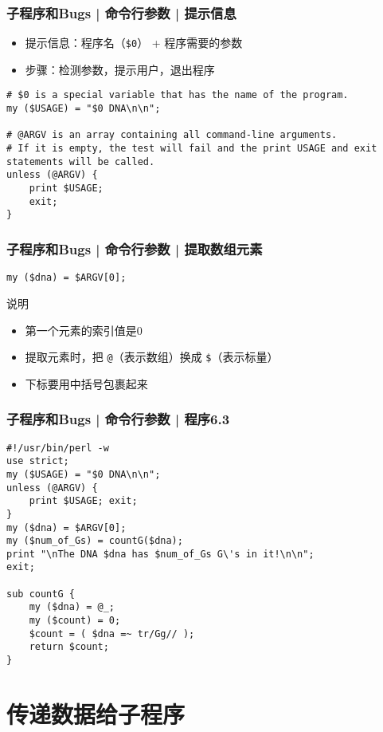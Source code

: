 \begin{frame}[fragile]
  \frametitle{子程序和Bugs | 命令行参数 | \alert{提示信息}}
  \begin{itemize}
    \item 提示信息：程序名（\verb|$0|） + 程序需要的参数
    \item 步骤：检测参数，提示用户，退出程序
  \end{itemize}
\begin{lstlisting}
# $0 is a special variable that has the name of the program.
my ($USAGE) = "$0 DNA\n\n";

# @ARGV is an array containing all command-line arguments.
# If it is empty, the test will fail and the print USAGE and exit statements will be called.
unless (@ARGV) {
    print $USAGE;
    exit;
}
\end{lstlisting}
\end{frame}

\begin{frame}[fragile]
  \frametitle{子程序和Bugs | 命令行参数 | \alert{提取数组元素}}
\begin{lstlisting}
my ($dna) = $ARGV[0];
\end{lstlisting}
\begin{block}{说明}
  \begin{itemize}
    \item 第一个元素的索引值是0
    \item 提取元素时，把 \verb|@|（表示数组）换成 \verb|$|（表示标量）
    \item 下标要用中括号包裹起来
  \end{itemize}
\end{block}
\end{frame}

\begin{frame}[fragile]
  \frametitle{子程序和Bugs | 命令行参数 | \alert{程序6.3}}
\begin{lstlisting}[basicstyle=\small\tt]
#!/usr/bin/perl -w
use strict;
my ($USAGE) = "$0 DNA\n\n";
unless (@ARGV) {
    print $USAGE; exit;
}
my ($dna) = $ARGV[0];
my ($num_of_Gs) = countG($dna);
print "\nThe DNA $dna has $num_of_Gs G\'s in it!\n\n";
exit;

sub countG {
    my ($dna) = @_;
    my ($count) = 0;
    $count = ( $dna =~ tr/Gg// );
    return $count;
}
\end{lstlisting}
\end{frame}

\section{传递数据给子程序}
